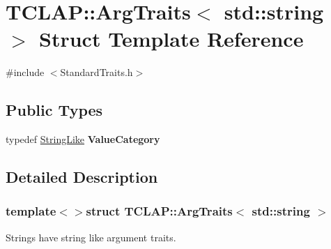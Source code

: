 \hypertarget{struct_t_c_l_a_p_1_1_arg_traits_3_01std_1_1string_01_4}{\section{T\-C\-L\-A\-P\-:\-:Arg\-Traits$<$ std\-:\-:string $>$ Struct Template Reference}
\label{struct_t_c_l_a_p_1_1_arg_traits_3_01std_1_1string_01_4}
}


{\ttfamily \#include $<$Standard\-Traits.\-h$>$}

\subsection*{Public Types}
\begin{DoxyCompactItemize}
\item 
\hypertarget{struct_t_c_l_a_p_1_1_arg_traits_3_01std_1_1string_01_4_a719adeb18786516dd4b2a16525cf4536}{typedef \hyperlink{struct_t_c_l_a_p_1_1_string_like}{String\-Like} {\bfseries Value\-Category}}\label{struct_t_c_l_a_p_1_1_arg_traits_3_01std_1_1string_01_4_a719adeb18786516dd4b2a16525cf4536}

\end{DoxyCompactItemize}


\subsection{Detailed Description}
\subsubsection*{template$<$$>$struct T\-C\-L\-A\-P\-::\-Arg\-Traits$<$ std\-::string $>$}

Strings have string like argument traits. 